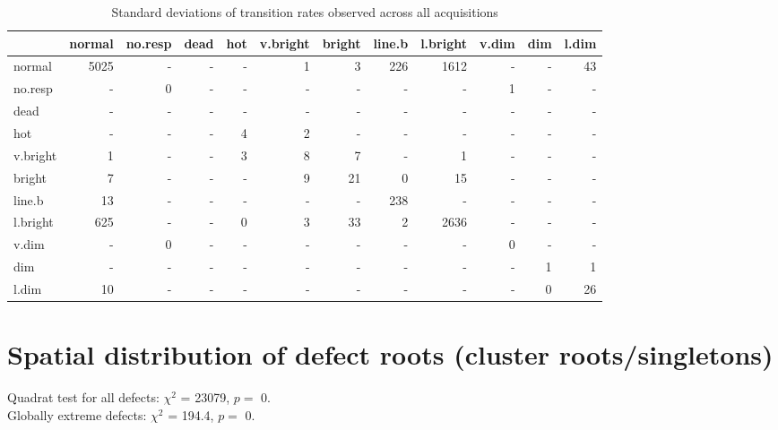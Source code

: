 \documentclass[10pt,fleqn]{article}\usepackage[]{graphicx}\usepackage[]{color}
\begin{document}
\begin{table}[!ht]
\caption{Standard deviations of transition rates observed across all acquisitions}
\begingroup\footnotesize
\begin{tabular}{l|rrrrrrrrrrr}
  \hline
 & normal & no.resp & dead & hot & v.bright & bright & line.b & l.bright & v.dim & dim & l.dim \\ 
  \hline
normal & 5025 & - & - & - & 1 & 3 & 226 & 1612 & - & - & 43 \\ 
  no.resp & - & 0 & - & - & - & - & - & - & 1 & - & - \\ 
  dead & - & - & - & - & - & - & - & - & - & - & - \\ 
  hot & - & - & - & 4 & 2 & - & - & - & - & - & - \\ 
  v.bright & 1 & - & - & 3 & 8 & 7 & - & 1 & - & - & - \\ 
  bright & 7 & - & - & - & 9 & 21 & 0 & 15 & - & - & - \\ 
  line.b & 13 & - & - & - & - & - & 238 & - & - & - & - \\ 
  l.bright & 625 & - & - & 0 & 3 & 33 & 2 & 2636 & - & - & - \\ 
  v.dim & - & 0 & - & - & - & - & - & - & 0 & - & - \\ 
  dim & - & - & - & - & - & - & - & - & - & 1 & 1 \\ 
  l.dim & 10 & - & - & - & - & - & - & - & - & 0 & 26 \\ 
   \hline
\end{tabular}
\endgroup

\end{table}



\FloatBarrier


\section{Spatial distribution of defect roots (cluster roots/singletons)}




Quadrat test for all defects: $\chi^2$ = 23079, $p =$ 0. \\
Globally extreme defects: $\chi^2$ = 194.4, $p = $ 0. 
\end{document}
